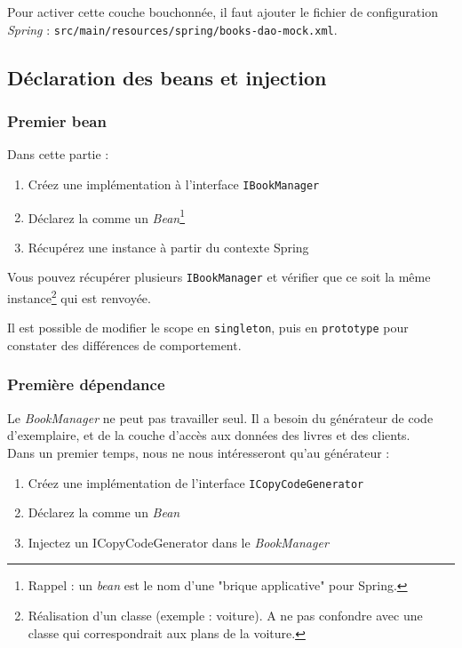 \documentclass[small,algo]{dushClass}
\begin{document}
Pour activer cette couche bouchonnée, il faut ajouter le fichier de configuration \emph{Spring} : \texttt{src/main/resources/spring/books-dao-mock.xml}.


\subsection{Déclaration des beans et injection}

\subsubsection{Premier bean}

Dans cette partie :
\begin{enumerate}
\item Créez une implémentation à l'interface \texttt{IBookManager}
\item Déclarez la comme un \emph{Bean}\footnote{Rappel : un \emph{bean} est le nom d'une "brique applicative" pour Spring.}
\item Récupérez une instance à partir du contexte Spring\\
\end{enumerate}

Vous pouvez récupérer plusieurs \texttt{IBookManager} et vérifier que ce soit la même instance\footnote{Réalisation d'un classe (exemple : voiture). A ne pas confondre avec une classe qui correspondrait aux plans de la voiture.} qui est renvoyée.\par
Il est possible de modifier le scope en \texttt{singleton}, puis en \texttt{prototype} pour constater des différences de comportement.

\subsubsection{Première dépendance}

Le \emph{BookManager} ne peut pas travailler seul. Il a besoin du générateur de code d'exemplaire, et de la couche d'accès aux données des livres et des clients.\\

Dans un premier temps, nous ne nous intéresseront qu'au générateur : 

\begin{enumerate}
\item Créez une implémentation de l'interface \texttt{ICopyCodeGenerator}
\item Déclarez la comme un \emph{Bean}
\item Injectez un ICopyCodeGenerator dans le \emph{BookManager}
\end{enumerate}
\end{document}
